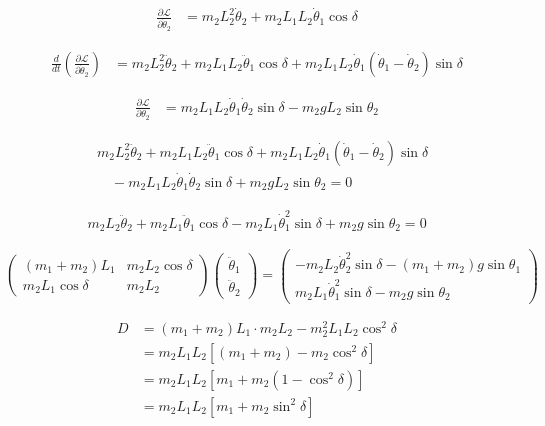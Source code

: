 \documentclass[10pt]{article}
\begin{document}
\begin{align*}
\frac{\partial \mathcal{L}}{\partial \dot{\theta}_2} &= m_2 L_2^2 \dot{\theta}_2 + m_2 L_1 L_2 \dot{\theta}_1 \cos\delta
\end{align*}

\begin{align*}
\frac{d}{dt}\left(\frac{\partial \mathcal{L}}{\partial \dot{\theta}_2}\right) &= m_2 L_2^2 \ddot{\theta}_2 + m_2 L_1 L_2 \ddot{\theta}_1 \cos\delta + m_2 L_1 L_2 \dot{\theta}_1 (\dot{\theta}_1 - \dot{\theta}_2) \sin\delta
\end{align*}

\begin{align*}
\frac{\partial \mathcal{L}}{\partial \theta_2} &= m_2 L_1 L_2 \dot{\theta}_1 \dot{\theta}_2 \sin\delta - m_2 g L_2 \sin\theta_2
\end{align*}

\begin{align*}
&m_2 L_2^2 \ddot{\theta}_2 + m_2 L_1 L_2 \ddot{\theta}_1 \cos\delta + m_2 L_1 L_2 \dot{\theta}_1 (\dot{\theta}_1 - \dot{\theta}_2) \sin\delta \\
&\quad - m_2 L_1 L_2 \dot{\theta}_1 \dot{\theta}_2 \sin\delta + m_2 g L_2 \sin\theta_2 = 0
\end{align*}

\begin{align*}
m_2 L_2 \ddot{\theta}_2 + m_2 L_1 \ddot{\theta}_1 \cos\delta - m_2 L_1 \dot{\theta}_1^2 \sin\delta + m_2 g \sin\theta_2 = 0
\end{align*}


\[
\begin{pmatrix}
(m_1 + m_2) L_1 & m_2 L_2 \cos\delta \\
m_2 L_1 \cos\delta & m_2 L_2
\end{pmatrix}
\begin{pmatrix}
\ddot{\theta}_1 \\
\ddot{\theta}_2
\end{pmatrix}
=
\begin{pmatrix}
-m_2 L_2 \dot{\theta}_2^2 \sin\delta - (m_1 + m_2) g \sin\theta_1 \\
m_2 L_1 \dot{\theta}_1^2 \sin\delta - m_2 g \sin\theta_2
\end{pmatrix}
\]


\begin{align*}
D &= (m_1 + m_2) L_1 \cdot m_2 L_2 - m_2^2 L_1 L_2 \cos^2\delta \\
&= m_2 L_1 L_2 \left[ (m_1 + m_2) - m_2 \cos^2\delta \right] \\
&= m_2 L_1 L_2 \left[ m_1 + m_2 (1 - \cos^2\delta) \right] \\
&= m_2 L_1 L_2 \left[ m_1 + m_2 \sin^2\delta \right]
\end{align*}
\end{document}
